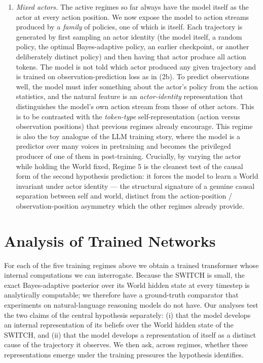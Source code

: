 \documentclass[11pt]{article}
\begin{document}
\begin{enumerate}
    \item \emph{Mixed actors.} The active regimes so far always have the model itself as the actor at every action position. We now expose the model to action streams produced by a \emph{family} of policies, one of which is itself. Each trajectory is generated by first sampling an actor identity (the model itself, a random policy, the optimal Bayes-adaptive policy, an earlier checkpoint, or another deliberately distinct policy) and then having that actor produce all action tokens. The model is not told which actor produced any given trajectory and is trained on observation-prediction loss as in (2b). To predict observations well, the model must infer something about the actor's policy from the action statistics, and the natural feature is an \emph{actor-identity} representation that distinguishes the model's own action stream from those of other actors. This is to be contrasted with the \emph{token-type} self-representation (action versus observation positions) that previous regimes already encourage. This regime is also the toy analogue of the LLM training story, where the model is a predictor over many voices in pretraining and becomes the privileged producer of one of them in post-training. Crucially, by varying the actor while holding the World fixed, Regime 5 is the cleanest test of the causal form of the second hypothesis prediction: it forces the model to learn a World invariant under actor identity --- the structural signature of a genuine causal separation between self and world, distinct from the action-position / observation-position asymmetry which the other regimes already provide.
\end{enumerate}

\section*{Analysis of Trained Networks}

For each of the five training regimes above we obtain a trained transformer whose internal computations we can interrogate. Because the SWITCH is small, the exact Bayes-adaptive posterior over its World hidden state at every timestep is analytically computable; we therefore have a ground-truth comparator that experiments on natural-language reasoning models do not have. Our analyses test the two claims of the central hypothesis separately: (i) that the model develops an internal representation of its beliefs over the World hidden state of the SWITCH, and (ii) that the model develops a representation of itself as a distinct cause of the trajectory it observes. We then ask, across regimes, whether these representations emerge under the training pressures the hypothesis identifies.
\end{document}
